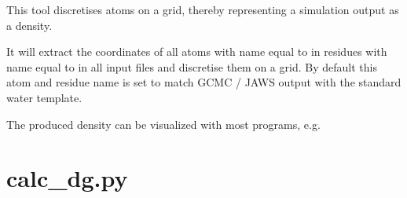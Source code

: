 \documentclass[letterpaper,10pt,english]{sphinxmanual}
\begin{document}
%
\begin{sphinxVerbatim}[commandchars=\\\{\}]
  
   
    
      
      
      
    
\end{sphinxVerbatim}


This tool discretises atoms on a grid, thereby representing a simulation output as a density.

It will extract the coordinates of all atoms with name equal to  in residues with name equal to  in all input files and discretise them on a grid. By default this atom and residue name is set to match GCMC / JAWS output with the standard water template.

The produced density can be visualized with most programs, e.g.

%
\begin{sphinxVerbatim}[commandchars=\\\{\}]
   
\end{sphinxVerbatim}


\section{calc\_dg.py}
\label{\detokenize{tools:calc-dg-py}}
\end{document}
